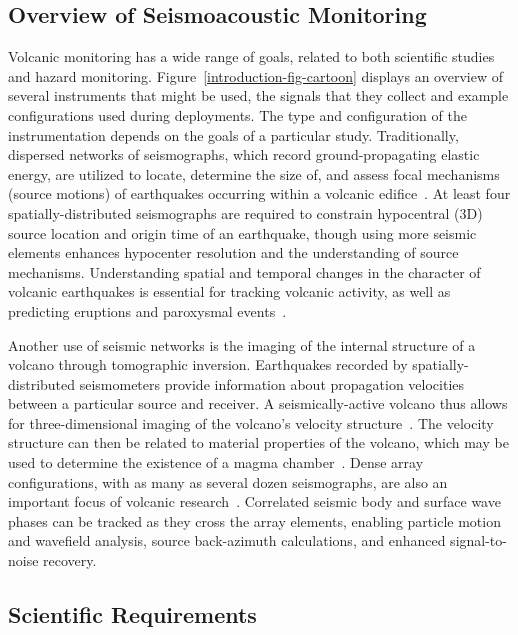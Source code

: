 \subsection{Overview of Seismoacoustic Monitoring}

Volcanic monitoring has a wide range of goals, related to both scientific
studies and hazard monitoring. Figure~\ref{introduction-fig-cartoon} displays
an overview of several instruments that might be used, the signals that they
collect and example configurations used during deployments. The type and
configuration of the instrumentation depends on the goals of a particular
study. Traditionally, dispersed networks of seismographs, which record
ground-propagating elastic energy, are utilized to locate, determine the size
of, and assess focal mechanisms (source motions) of earthquakes occurring
within a volcanic edifice~\cite{Chouet03}. At least four
spatially-distributed seismographs are required to constrain hypocentral (3D)
source location and origin time of an earthquake, though using more seismic
elements enhances hypocenter resolution and the understanding of source
mechanisms. Understanding spatial and temporal changes in the character of
volcanic earthquakes is essential for tracking volcanic activity, as well as
predicting eruptions and paroxysmal events~\cite{McNutt96}.

Another use of seismic networks is the imaging of the internal structure of a
volcano through tomographic inversion. Earthquakes recorded by
spatially-distributed seismometers provide information about propagation
velocities between a particular source and receiver. A seismically-active
volcano thus allows for three-dimensional imaging of the volcano's velocity
structure~\cite{Benz96,Phillips91}. The velocity structure can then be
related to material properties of the volcano, which may be used to determine
the existence of a magma chamber~\cite{Lees89,Moran99}. Dense array
configurations, with as many as several dozen seismographs, are also an
important focus of volcanic research~\cite{Dietel89,Neuberg94}. Correlated
seismic body and surface wave phases can be tracked as they cross the array
elements, enabling particle motion and wavefield analysis, source
back-azimuth calculations, and enhanced signal-to-noise recovery.

\subsection{Scientific Requirements}

